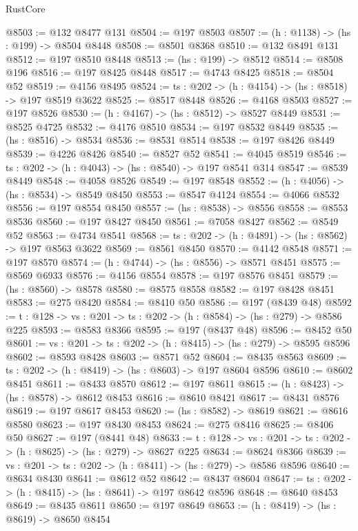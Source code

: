 \begin{lexlean}{RustCore}
\begin{coremodule}
@8503 := @132 @8477 @131
@8504 := @197 @8503
@8507 := (h : @1138) -> (hs : @199) -> @8504 @8448
@8508 := @8501 @8368
@8510 := @132 @8491 @131
@8512 := @197 @8510 @8448
@8513 := (hs : @199) -> @8512
@8514 := @8508 @196
@8516 := @197 @8425 @8448
@8517 := @4743 @8425
@8518 := @8504 @52
@8519 := @4156 @8495
@8524 := {ts : @202} -> (h : @4154) -> (hs : @8518) -> @197 @8519 @3622
@8525 := @8517 @8448
@8526 := @4168 @8503
@8527 := @197 @8526
@8530 := (h : @4167) -> (hs : @8512) -> @8527 @8449
@8531 := @8525 @4725
@8532 := @4176 @8510
@8534 := @197 @8532 @8449
@8535 := (hs : @8516) -> @8534
@8536 := @8531 @8514
@8538 := @197 @8426 @8449
@8539 := @4226 @8426
@8540 := @8527 @52
@8541 := @4045 @8519
@8546 := {ts : @202} -> (h : @4043) -> (hs : @8540) -> @197 @8541 @314
@8547 := @8539 @8449
@8548 := @4058 @8526
@8549 := @197 @8548
@8552 := (h : @4056) -> (hs : @8534) -> @8549 @8450
@8553 := @8547 @4124
@8554 := @4066 @8532
@8556 := @197 @8554 @8450
@8557 := (hs : @8538) -> @8556
@8558 := @8553 @8536
@8560 := @197 @8427 @8450
@8561 := @7058 @8427
@8562 := @8549 @52
@8563 := @4734 @8541
@8568 := {ts : @202} -> (h : @4891) -> (hs : @8562) -> @197 @8563 @3622
@8569 := @8561 @8450
@8570 := @4142 @8548
@8571 := @197 @8570
@8574 := (h : @4744) -> (hs : @8556) -> @8571 @8451
@8575 := @8569 @6933
@8576 := @4156 @8554
@8578 := @197 @8576 @8451
@8579 := (hs : @8560) -> @8578
@8580 := @8575 @8558
@8582 := @197 @8428 @8451
@8583 := @275 @8420
@8584 := @8410 @50
@8586 := @197 (@8439 @48)
@8592 := {t : @128} -> {vs : @201} -> {ts : @202} -> (h : @8584) -> (hs : @279) -> @8586 @225
@8593 := @8583 @8366
@8595 := @197 (@8437 @48)
@8596 := @8452 @50
@8601 := {vs : @201} -> {ts : @202} -> (h : @8415) -> (hs : @279) -> @8595 @8596
@8602 := @8593 @8428
@8603 := @8571 @52
@8604 := @8435 @8563
@8609 := {ts : @202} -> (h : @8419) -> (hs : @8603) -> @197 @8604 @8596
@8610 := @8602 @8451
@8611 := @8433 @8570
@8612 := @197 @8611
@8615 := (h : @8423) -> (hs : @8578) -> @8612 @8453
@8616 := @8610 @8421
@8617 := @8431 @8576
@8619 := @197 @8617 @8453
@8620 := (hs : @8582) -> @8619
@8621 := @8616 @8580
@8623 := @197 @8430 @8453
@8624 := @275 @8416
@8625 := @8406 @50
@8627 := @197 (@8441 @48)
@8633 := {t : @128} -> {vs : @201} -> {ts : @202} -> (h : @8625) -> (hs : @279) -> @8627 @225
@8634 := @8624 @8366
@8639 := {vs : @201} -> {ts : @202} -> (h : @8411) -> (hs : @279) -> @8586 @8596
@8640 := @8634 @8430
@8641 := @8612 @52
@8642 := @8437 @8604
@8647 := {ts : @202} -> (h : @8415) -> (hs : @8641) -> @197 @8642 @8596
@8648 := @8640 @8453
@8649 := @8435 @8611
@8650 := @197 @8649
@8653 := (h : @8419) -> (hs : @8619) -> @8650 @8454

\end{coremodule}
\end{lexlean}
